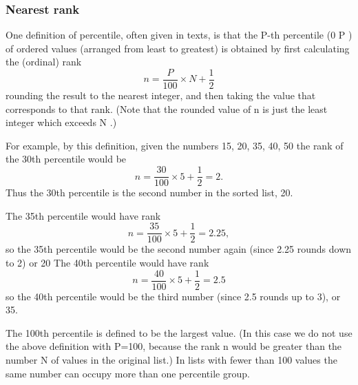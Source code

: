 \begin{frame}
\frametitle{Nearest rank}
One definition of percentile, often given in texts, is that the P-th percentile (0 \le P ) of 
ordered values (arranged from least to greatest) is obtained by first calculating the (ordinal) rank
 \[n = \frac{P}{100} \times N + \frac{1}{2}\]
rounding the result to the nearest integer, and then taking the value that corresponds to that rank. (Note that the rounded value of n is just the least integer which exceeds   \times N .)
\end{frame}
\begin{frame}
For example, by this definition, given the numbers
15, 20, 35, 40, 50
the rank of the 30th percentile would be
\[n = \frac{30}{100} \times 5 + \frac{1}{2} = 2.\]
Thus the 30th percentile is the second number in the sorted list, 20.
\end{frame}
\begin{frame}
The 35th percentile would have rank
\[n = \frac{35}{100} \times 5 + \frac{1}{2} = 2.25,\]
so the 35th percentile would be the second number again (since 2.25 rounds down to 2) or 20
The 40th percentile would have rank
\[n = \frac{40}{100} \times 5 + \frac{1}{2} = 2.5\]
so the 40th percentile would be the third number (since 2.5 rounds up to 3), or 35.
\end{frame}
\begin{frame}

The 100th percentile is defined to be the largest value. (In this case we do not use the above definition with P=100, because the rank n would be greater than the number N of values in the original list.)
In lists with fewer than 100 values the same number can occupy more than one percentile group.
\end{frame}
